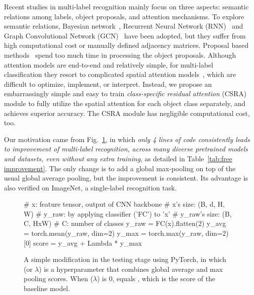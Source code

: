 \documentclass[10pt,twocolumn,letterpaper]{article}
\begin{document}
Recent studies in multi-label recognition mainly focus on three aspects: semantic relations among labels, object proposals, and attention mechanisms. To explore semantic relations, Bayesian network~\cite{2011_IJCAI_Markov,2016_CVPR_condition_graph}, Recurrent Neural Network (RNN)~\cite{2017_CVPR_RNN,2016_CVPR_RNNCNN} and Graph Convolutional Network (GCN)~\cite{2019_CVPR_GCN,2019_ICCV_GCNre} have been adopted, but they suffer from high computational cost or manually defined adjacency matrices. Proposal based methods~\cite{2015_PAMI_HCP,2016_ICIP_RCP,Wider} spend too much time in processing the object proposals. Although attention models are end-to-end and relatively simple, for multi-label classification they resort to complicated spatial attention models~\cite{2018_ECCV_CAM,2017_CVPR_SRN,2020_arxiv_Gaobb}, which are difficult to optimize, implement, or interpret. Instead, we propose an embarrassingly simple and easy to train \emph{class-specific residual attention} (CSRA) module to fully utilize the spatial attention for each object class separately, and achieves superior accuracy. The CSRA module has negligible computational cost, too.

Our motivation came from Fig.~\ref{fig:pytorch code}, in which \emph{only 4 lines of code consistently leads to improvement of multi-label recognition, across many diverse pretrained models and datasets, even \emph{without} any extra training}, as detailed in Table~\ref{tab:free improvement}. The only change is to add a global max-pooling on top of the usual global average pooling, but the improvement is consistent. Its advantage is also verified on ImageNet, a single-label recognition task.

\begin{figure}
\begin{python}
  # x: feature tensor, output of CNN backbone
  # x's size: (B, d, H, W)
  # y_raw: by applying classifier ('FC') to 'x'
  # y_raw's size: (B, C, HxW)
  # C: number of classes
  y_raw = FC(x).flatten(2)
  y_avg = torch.mean(y_raw, dim=2)
  y_max = torch.max(y_raw, dim=2)[0]
  score = y_avg + Lambda * y_max
\end{python} \caption{A simple modification in the testing stage using PyTorch, in which  (or $\lambda$) is a hyperparameter that combines global average and max pooling scores. When  ($\lambda$) is 0,  equals , which is the score of the baseline model.}
\label{fig:pytorch code}
\end{figure}
\end{document}
